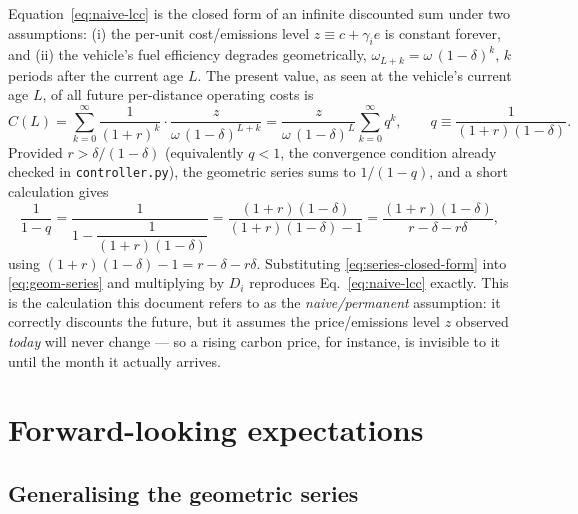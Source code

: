 \documentclass[11pt]{article}
\newcommand{\code}[1]{\texttt{#1}}
\begin{document}
Equation~\eqref{eq:naive-lcc} is the closed form of an infinite discounted
sum under two assumptions: (i) the per-unit cost/emissions level
$z \equiv c + \gamma_i e$ is constant forever, and (ii) the vehicle's fuel
efficiency degrades geometrically, $\omega_{L+k} = \omega\,(1-\delta)^{k}$,
$k$ periods after the current age $L$. The present value, as seen at the
vehicle's current age $L$, of all future per-distance operating costs is
\begin{equation}
  C(L) = \sum_{k=0}^{\infty}
    \frac{1}{(1+r)^{k}} \cdot \frac{z}{\omega\,(1-\delta)^{L+k}}
  = \frac{z}{\omega\,(1-\delta)^{L}} \sum_{k=0}^{\infty} q^{k},
  \qquad
  q \equiv \frac{1}{(1+r)(1-\delta)} .
  \label{eq:geom-series}
\end{equation}
Provided $r > \delta/(1-\delta)$ (equivalently $q<1$, the convergence
condition already checked in \code{controller.py}), the geometric series
sums to $1/(1-q)$, and a short calculation gives
\begin{equation}
  \frac{1}{1-q}
  = \frac{1}{1 - \dfrac{1}{(1+r)(1-\delta)}}
  = \frac{(1+r)(1-\delta)}{(1+r)(1-\delta) - 1}
  = \frac{(1+r)(1-\delta)}{r - \delta - r\delta} ,
  \label{eq:series-closed-form}
\end{equation}
using $(1+r)(1-\delta) - 1 = r - \delta - r\delta$. Substituting
\eqref{eq:series-closed-form} into \eqref{eq:geom-series} and multiplying by
$D_i$ reproduces Eq.~\eqref{eq:naive-lcc} exactly. This is the calculation
this document refers to as the \emph{naive/permanent} assumption: it
correctly discounts the future, but it assumes the price/emissions level $z$
observed \emph{today} will never change --- so a rising carbon price, for
instance, is invisible to it until the month it actually arrives.

\section{Forward-looking expectations}
\label{sec:forward-looking}

\subsection{Generalising the geometric series}
\end{document}
